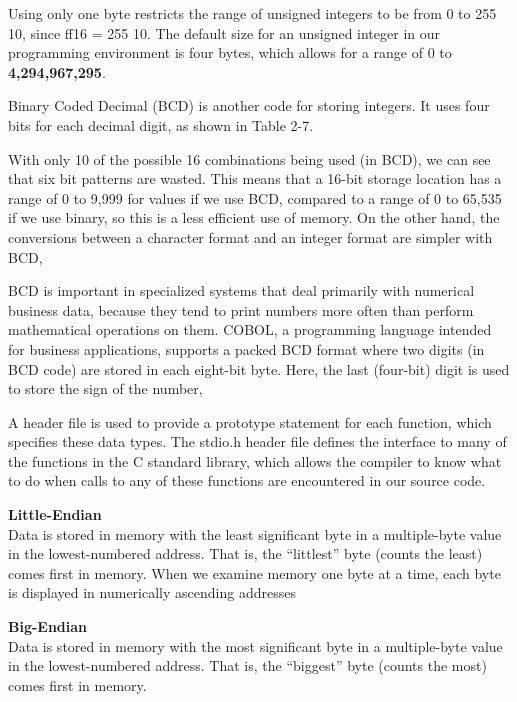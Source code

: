 \documentclass[12pt]{extarticle}
\begin{document}
\vspace{18pt}
Using only one byte restricts the range of unsigned integers to be from 0 to 255 10, since
ff16 = 255 10. The default size for an unsigned integer in our programming environment is four
bytes, which allows for a range of 0 to \textbf{4,294,967,295}.

\vspace{18pt}
Binary Coded Decimal (BCD) is another code for storing integers. It uses
four bits for each decimal digit, as shown in Table 2-7.

\vspace{18pt}
With only 10 of the possible 16 combinations being used (in BCD), we can see that six bit
patterns are wasted. This means that a 16-bit storage location has a range of 0 to 9,999 
for values if we use BCD, compared to a range of 0 to 65,535 if we use binary, so this is 
a less efficient use of memory. On the other hand, the conversions between a character 
format and an integer format are simpler with BCD,

\vspace{18pt}
BCD is important in specialized systems that deal primarily with numerical business data,
because they tend to print numbers more often than perform mathematical operations on them.
COBOL, a programming language intended for business applications, supports a packed BCD format
where two digits (in BCD code) are stored in each eight-bit byte. Here, the last (four-bit)
digit is used to store the sign of the number,

\vspace{18pt}
A header file is used to provide a prototype statement for each function, which specifies
these data types. The stdio.h header file defines the interface to many of the functions 
in the C standard library, which allows the compiler to know what to do when calls to any 
of these functions are encountered in our source code.

\vspace{18pt}
\textbf{Little-Endian}\\
Data is stored in memory with the least significant byte in a multiple-byte
value in the lowest-numbered address. That is, the “littlest” byte (counts the
least) comes first in memory.
When we examine memory one byte at a time, each byte is displayed in
numerically ascending addresses

\vspace{18pt}
\textbf{Big-Endian}\\
Data is stored in memory with the most significant byte in a multiple-byte
value in the lowest-numbered address. That is, the “biggest” byte (counts
the most) comes first in memory.
\end{document}
